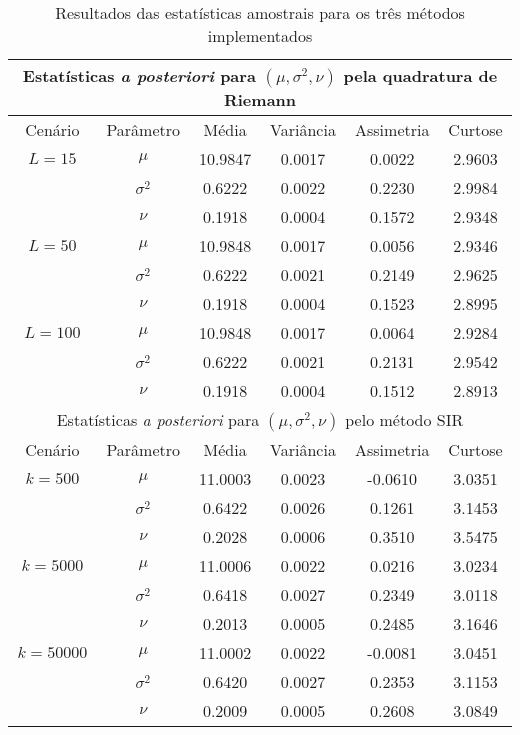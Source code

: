 \begin{table}[htb]
	\caption{Resultados das estatísticas amostrais para os três métodos implementados}
	\centering
	\begin{tabular}{cccccc}
		\toprule
		\multicolumn{6}{c}{Estatísticas \textit{a posteriori} para $(\mu, \sigma^2, \nu)$ pela quadratura de Riemann} \\
		\midrule
		Cenário & Parâmetro & Média & Variância & Assimetria & Curtose \\
		\midrule
		$L = 15$ & $\mu$      & 10.9847 & 0.0017 & 0.0022 & 2.9603 \\
		& $\sigma^2$ &  0.6222 & 0.0022 & 0.2230 & 2.9984 \\
		& $\nu$      &  0.1918 & 0.0004 & 0.1572 & 2.9348 \\
		\midrule
		$L = 50$ & $\mu$      & 10.9848 & 0.0017 & 0.0056 & 2.9346 \\
		& $\sigma^2$ &  0.6222 & 0.0021 & 0.2149 & 2.9625 \\
		& $\nu$      &  0.1918 & 0.0004 & 0.1523 & 2.8995 \\
		\midrule
		$L = 100$ & $\mu$      & 10.9848 & 0.0017 & 0.0064 & 2.9284 \\
		& $\sigma^2$ &  0.6222 & 0.0021 & 0.2131 & 2.9542 \\
		& $\nu$      &  0.1918 & 0.0004 & 0.1512 & 2.8913 \\
		\midrule
		\multicolumn{6}{c}{Estatísticas \textit{a posteriori} para $(\mu, \sigma^2, \nu)$ pelo método SIR} \\
		\midrule
		Cenário & Parâmetro & Média & Variância & Assimetria & Curtose \\
		\midrule
		$k = 500$ & $\mu$      & 11.0003 & 0.0023 & -0.0610 & 3.0351 \\
		& $\sigma^2$ &  0.6422 & 0.0026 &  0.1261 & 3.1453 \\
		& $\nu$      &  0.2028 & 0.0006 &  0.3510 & 3.5475 \\
		\midrule
		$k = 5000$ & $\mu$      & 11.0006 & 0.0022 &  0.0216 & 3.0234 \\
		& $\sigma^2$ &  0.6418 & 0.0027 &  0.2349 & 3.0118 \\
		& $\nu$      &  0.2013 & 0.0005 &  0.2485 & 3.1646 \\
		\midrule
		$k = 50000$ & $\mu$      & 11.0002 & 0.0022 & -0.0081 & 3.0451 \\
		& $\sigma^2$ &  0.6420 & 0.0027 &  0.2353 & 3.1153 \\
		& $\nu$      &  0.2009 & 0.0005 &  0.2608 & 3.0849 \\

\end{tabular}
\end{table}
